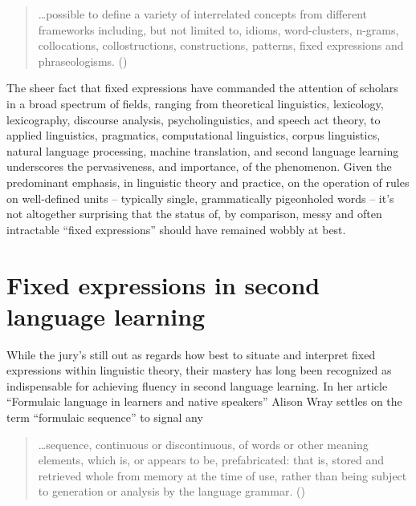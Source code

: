 \documentclass[output=paper]{langsci/langscibook}
\begin{document}
\begin{quote}
    …possible to define a variety of interrelated concepts from different frameworks including, but not limited to, idioms, word-clusters, n-grams, collocations, collostructions, constructions, patterns, fixed expressions and phraseologisms. (\citealt[21]{granger_phraseology_2008})
\end{quote}

The sheer fact that fixed expressions have commanded the attention of scholars in a broad spectrum of fields, ranging from theoretical linguistics, lexicology, lexicography, discourse analysis, psycholinguistics, and speech act theory, to applied linguistics, pragmatics, computational linguistics, corpus linguistics, natural language processing, machine translation, and second language learning underscores the pervasiveness, and importance, of the phenomenon. Given the predominant emphasis, in linguistic theory and practice, on the operation of rules on well-defined units – typically single, grammatically pigeonholed words – it’s not altogether surprising that the status of, by comparison, messy and often intractable ``fixed expressions'' should have remained wobbly at best. 

\section{Fixed expressions in second language learning}

While the jury’s still out as regards how best to situate and interpret fixed expressions within linguistic theory, their mastery has long been recognized as indispensable for achieving fluency in second language learning. In her article “Formulaic language in learners and native speakers” Alison Wray settles on the term ``formulaic sequence'' to signal any 

\begin{quote}
    …sequence, continuous or discontinuous, of words or other meaning elements, which is, or appears to be, prefabricated: that is, stored and retrieved whole from memory at the time of use, rather than being subject to generation or analysis by the language grammar. (\citeyear[214]{wray_formulaic_1999})  
\end{quote}
\end{document}
